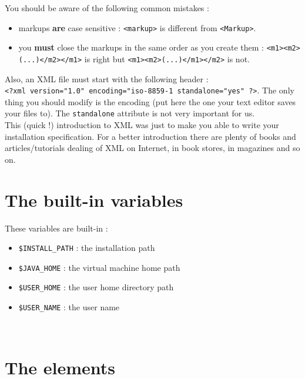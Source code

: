 You should be aware of the following common mistakes :
\begin{itemize}

  \item markups \textbf{are} case sensitive : \texttt{<markup>} is different
  from \texttt{<Markup>}.
  
  \item you \textbf{must} close the markups in the same order as you create them
  : \texttt{<m1><m2>(...)</m2></m1>} is right but 
  \texttt{<m1><m2>(...)</m1></m2>} is not.

\end{itemize}

Also, an XML file must start with the following header :\\
\texttt{<?xml version="1.0" encoding="iso-8859-1 standalone="yes" ?>}. The only
thing you should modify is the encoding (put here the one your text editor saves
your files to). The \texttt{standalone} attribute is not very important for
us.\\

This (quick !) introduction to XML was just to make you able to write your
installation specification. For a better introduction there are plenty of books
and articles/tutorials dealing of XML on Internet, in book stores, in magazines
and so on.\\

\section{The built-in variables}

These variables are built-in :
\begin{itemize}

  \item \texttt{\$INSTALL\_PATH} : the installation path
  \item \texttt{\$JAVA\_HOME} : the \Java virtual machine home path
  \item \texttt{\$USER\_HOME} : the user home directory path
  \item \texttt{\$USER\_NAME} : the user name

\end{itemize}\

\section{The \IzPack elements}

